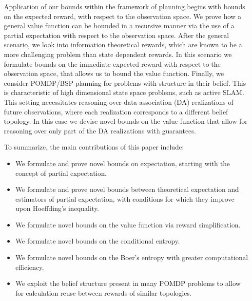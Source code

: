 Application of our bounds within the framework of planning begins with bounds on the expected reward, with respect to the observation space. We prove how a general value function can be bounded in a recursive manner via the use of a partial expectation with respect to the observation space. After the general scenario, we look into information theoretical rewards, which are known to be a more challenging problem than state dependent rewards. In this scenario we formulate bounds on the immediate expected reward with respect to the observation space, that allows us to bound the value function. Finally, we consider POMDP/BSP planning for problems with structure in their belief. This is characteristic of high dimensional state space problems, such as active SLAM. This setting necessitates reasoning over data association (DA) realizations of future observations, where each realization corresponds to a different belief topology. In this case we devise novel bounds on the value function that allow for reasoning over only part of the DA realizations with guarantees.

To summarize, the main contributions of this paper include:
\begin{itemize}
	\item We formulate and prove novel bounds on expectation, starting with the concept of partial expectation.
	\item We formulate and prove novel bounds between theoretical expectation and estimators of partial expectation, with conditions for which they improve upon Hoeffding's inequality.
	\item We formulate novel bounds on the value function via reward simplification.
	\item We formulate novel bounds on the conditional entropy.
	\item We formulate novel bounds on the Boer's entropy with greater computational efficiency.
	\item We exploit the belief structure present in many POMDP problems to allow for calculation reuse between rewards of similar topologies.
\end{itemize}


